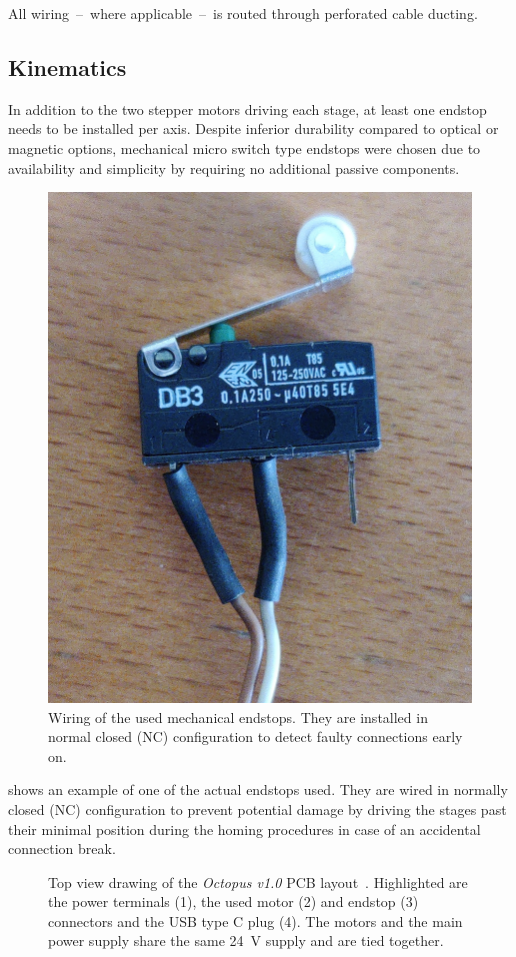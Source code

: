         All wiring~--~where applicable~--~is routed through perforated cable ducting.

        \subsection{Kinematics}\label{sec:kinematics}
            In addition to the two stepper motors driving each stage, at least one endstop needs to be installed per axis.
            Despite inferior durability compared to optical or magnetic options, mechanical micro switch type endstops were chosen due to availability and simplicity by requiring no additional passive components.
            \begin{figure}[h]
                \centering
                \includegraphics[width=.25\textwidth]{pictures/footage/endstop_switch.jpg}
                \caption[Wiring of the used mechanical endstops]{Wiring of the used mechanical endstops. They are installed in normal closed (NC) configuration to detect faulty connections early on.}%
                \label{fig:endstop pic}
            \end{figure}

             shows an example of one of the actual endstops used.
            They are wired in normally closed (NC) configuration to prevent potential damage by driving the stages past their minimal position during the homing procedures in case of an accidental connection break.

            \begin{figure}[h]
                \centering
                
                \caption[Top view drawing of the \textit{Octopus v1.0} PCB layout]{Top view drawing of the \textit{Octopus v1.0} PCB layout~\cite{Manual.BigTreeTechOctopus}. Highlighted are the power terminals (1), the used motor (2) and endstop (3) connectors and the USB type C plug (4). The motors and the main power supply share the same \qty{24}{\volt} supply and are tied together.}%
                \label{fig:octopus connections}
            \end{figure}


